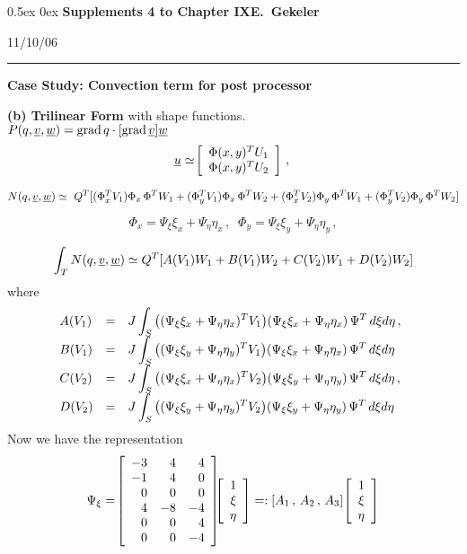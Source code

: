 \documentclass[12pt,a4paper,USenglish,twoside]{book}
\begin{document}
\setlength{\fboxsep}{1ex}
\newcommand{\Release}{11/10/06}
\addtolength{\abovedisplayshortskip}{-1ex}
\setlength{\fboxsep}{1.5ex}
\parskip0.5ex
\parindent0ex
\mainmatter
%
{\large\bf Supplements 4 to Chapter IX\hfill E.\ Gekeler
}
\par
\vspace{-1mm}
\hfill{\footnotesize\Release\ }
\par
\vspace{-2mm}
\rule{\textwidth}{1pt}
\par\vspace{2ex}
{\bf Case Study: Convection term for post processor}
\par
%
{\bf (b) Trilinear Form} with shape functions.\\
$
P(q,\v,\w) = \grad q \cdot [\grad \v]\w
$
\[
\u \simeq \ \ba{[}{r}\Phi(x,y)^TU_1\\ \Phi(x,y)^TU_2\ea{]}\,,\;
\]
\par\vspace{1ex}
\[
N(q,\v,\w) \simeq \
Q^T [(\Phi_x^TV_1)\Phi_x\,\Phi^TW_1 + (\Phi_y^TV_1)\Phi_x\,\Phi^TW_2
     +(\Phi_x^TV_2)\Phi_y\,\Phi^TW_1 + (\Phi_y^TV_2)\Phi_y\,\Phi^T W_2]
\]
\par
\[
\Phi_x = \Psi_{\xi}\xi_x + \Psi_{\eta}\eta_x\,,\;\;
\Phi_y = \Psi_{\xi}\xi_y + \Psi_{\eta}\eta_y\,,
\]
\par\vspace{1ex}
\[
\int_TN(q,\v,\w) \simeq
Q^T[A(V_1)W_1 + B(V_1)W_2 + C(V_2)W_1 +  D(V_2)W_2]
\]
where
\begin{equation}\label{e2}
\ba{.}{lll}
A(V_1) &=& \dis J\int_S\big((\Psi_{\xi}\xi_x + \Psi_{\eta}\eta_x)^TV_1\big)
(\Psi_{\xi}\xi_x + \Psi_{\eta}\eta_x)\,\Psi^T\, d\xi d\eta\,, \\[1ex]
B(V_1) &=& \dis J\int_S\big((\Psi_{\xi}\xi_y + \Psi_{\eta}\eta_y)^TV_1\big)
(\Psi_{\xi}\xi_x + \Psi_{\eta}\eta_x)\,\Psi^T\, d\xi d\eta\\[1ex]
C(V_2) &=& \dis J\int_S\big((\Psi_{\xi}\xi_x + \Psi_{\eta}\eta_x)^TV_2\big)
(\Psi_{\xi}\xi_y + \Psi_{\eta}\eta_y)\, \Psi^T\, d\xi d\eta \,,\\[1ex]
D(V_2) &=& \dis J\int_S\big((\Psi_{\xi}\xi_y + \Psi_{\eta}\eta_y)^TV_2\big)
(\Psi_{\xi}\xi_y + \Psi_{\eta}\eta_y)\,\Psi^T\, d\xi d\eta
\ea{.}
\end{equation}
Now we have the representation
\[
\Psi_{\xi} = \ \ba{[}{rrr}
 -3 & 4 & 4\\
 -1 & 4 & 0\\
 0 & 0 & 0\\
 4 & -8 & -4\\
 0 & 0 & 4\\
0 & 0 & -4\ea{]}
\ba{[}{r}1\\ \xi \\ \eta\ea{]}
 =: [A_1\,,\, A_2\,,\, A_3]\ \ba{[}{r}1\\ \xi \\ \eta\ea{]}
\]
\end{document}
